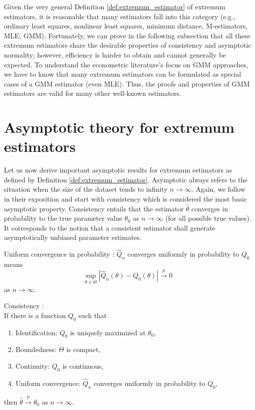 Given the very general Definition \ref{def:extremum_estimator} of extremum estimators, it is reasonable that many estimators fall into this category (e.g., ordinary least squares, nonlinear least squares, minimum distance, M-estimators, MLE, GMM).
Fortunately, we can prove in the following subsection that all these extremum estimators share the desirable properties of consistency and asymptotic normality; however, efficiency is harder to obtain and cannot generally be expected.
To understand the econometric literature's focus on GMM approaches, we have to know that many extremum estimators can be formulated as special cases of a GMM estimator (even MLE).
Thus, the proofs and properties of GMM estimators are valid for many other well-known estimators. 

\section{Asymptotic theory for extremum estimators}
\label{sec:asymptotics_theory_extremum_estimators}

Let us now derive important asymptotic results for extremum estimators as defined by Definition \ref{def:extremum_estimator}.
Asymptotic always refers to the situation when the size of the dataset tends to infinity $n \rightarrow \infty$.
Again, we follow \cite{NM94} in their exposition and start with consistency which is considered the most basic asymptotic property.
Consistency entails that the estimator $\hat{\theta}$ converges in probability to the true parameter value $\theta_0$ as $n \rightarrow \infty$ (for all possible true values).
It corresponds to the notion that a consistent estimator shall generate asymptotically unbiased parameter estimates.

\begin{definition}
	\label{def:uniform_convergence_probability}
	Uniform convergence in probability \cite[Section 2.1]{NM94}:
	$\hat{Q}_n$ converges uniformly in probability to $Q_0$ means
	\[
	\sup_{\theta \in \Theta} \left| \hat{Q}_n(\theta) - Q_0(\theta) \right| \xrightarrow{p} 0
	\]
	as $n \rightarrow \infty$.
\end{definition}

\begin{theorem}
	\label{theo:consistency}
	Consistency \citep[Theorem 2.1]{NM94}: \\
	If there is a function $Q_0$ such that 
	\begin{enumerate}
		\item Identification: $Q_0$ is uniquely maximized at $\theta_0$,
		\item Boundedness: $\Theta$ is compact,
		\item Continuity: $Q_0$ is continuous,
		\item Uniform convergence: $\hat{Q}_n$ converges uniformly in probability to $Q_0$,
	\end{enumerate}
	then $\hat{\theta} \xrightarrow{p} \theta_0$ as $n \rightarrow \infty$.
\end{theorem}

